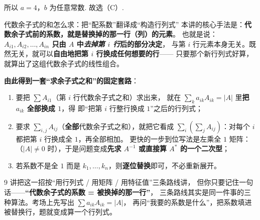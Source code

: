 所以 $a=4$，$b$ 为任意常数. 故选（C）.


\begin{fdeep}{代数余子式的和怎么求：把“配系数”翻译成“构造行列式”}
本讲的核心手法是：\textbf{代数余子式前的系数，就是替换掉的那一行（列）的元素}。
也就是说：\textbf{$A_{i1},A_{i2},\dots,A_{in}$ 只由 $A$ 中\emph{去掉第 $i$ 行}后的部分决定}，
与第 $i$ 行元素本身无关。既然无关，就可以\textbf{自由地把第 $i$ 行换成任何想要的行}——
只要那个新行列式好算，就算出了这组代数余子式的线性组合。

\medskip
\textbf{由此得到一套“求余子式之和”的固定套路}：
\begin{enumerate}[leftmargin=2.2em,itemsep=0.25em]
\item 要把 $\sum A_{i1}$（第 $i$ 行代数余子式之和）求出来，
      就在 $\sum_k a_{ik}A_{ik}=|A|$ 里\textbf{把 $a_{ik}$ 全部换成 $1$}，得
      即“把第 $i$ 行整行换成 $1$”之后的行列式；
\item 要求 $\sum_{i,j}A_{ij}$（\textbf{全部}代数余子式之和），就把它看成
      $\sum_i\left(\sum_j A_{ij}\right)$：对每个 $i$ 都把第 $i$ 行换成全 $1$，再全部相加。
      更快的一步到位写法是左乘全 $1$ 矩阵：
      （$|A|\ne0$ 时），于是问题变成\textbf{先求 $A^{-1}$ 或直接算 $A^{*}$ 的一个二次型}；
\item 若系数不是全 $1$ 而是 $k_1,\dots,k_n$，则\textbf{逐位替换}即可，不必重新展开。
\end{enumerate}
\fbref{}9 讲把这一招按“用行列式 / 用矩阵 / 用特征值”三条路线讲，
但你只要记住一句话——\textbf{“代数余子式的系数 = 被换掉的那一行”}，
三条路线其实是同一件事的三种算法。考场上先写出 $\sum a_{ik}A_{ik}=|A|$，
再问“我要的系数是什么”，把系数填进被替换行，题就变成算一个行列式。
\end{fdeep}

